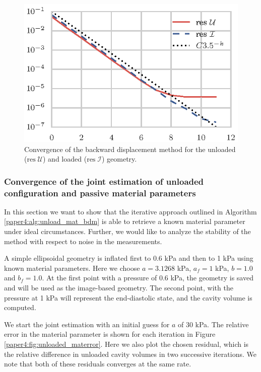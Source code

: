 \begin{figure}[htbp]
  \centering
  \includegraphics{figures/unloaded_error}
  \caption{\label{paper4:fig:unloaded_convergece_test}Convergence of the
    backward displacement method for the unloaded
    ($\mathrm{res}\;\mathcal{U}$) and loaded
    ($\mathrm{res}\;\mathcal{I}$) geometry.}
\end{figure}


\subsubsection{Convergence of the joint estimation of unloaded
  configuration and passive material parameters}
\label{paper4:sec:convergence_unloaded_material}

In this section we want to show that the iterative approach outlined
in Algorithm \ref{paper4:alg:unload_mat_bdm} is able to retrieve a known
material parameter under ideal circumstances. Further, we would like
to analyze the stability of the method with respect to noise in the
measurements.

A simple ellipsoidal geometry is inflated first to 0.6 kPa and then
to 1 kPa using known material parameters. Here we choose $a=3.1268$
kPa, $a_f = 1$ kPa, $b=1.0$ and $b_f=1.0$. At the first point with a
pressure of 0.6 kPa, the geometry is saved and will be used as the image-based
geometry. The second point, with the pressure at 1 kPa will represent
the end-diastolic state, and the cavity volume is computed.

We start the joint estimation with an initial guess for $a$ of 30
kPa. The relative error in the material
parameter is shown for each iteration in Figure
\ref{paper4:fig:unloaded_materror}. Here we also plot the chosen residual, which
is the relative difference in unloaded cavity volumes in two
successive iterations. We note that both of these residuals
converges at the same rate. 


